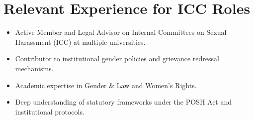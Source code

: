 \section{Relevant Experience for ICC Roles}
\begin{itemize}[leftmargin=*, noitemsep]
    \item Active Member and Legal Advisor on Internal Committees on Sexual Harassment (ICC) at multiple universities.
    \item Contributor to institutional gender policies and grievance redressal mechanisms.
    \item Academic expertise in Gender \& Law and Women’s Rights.
    \item Deep understanding of statutory frameworks under the POSH Act and institutional protocols.
\end{itemize}
